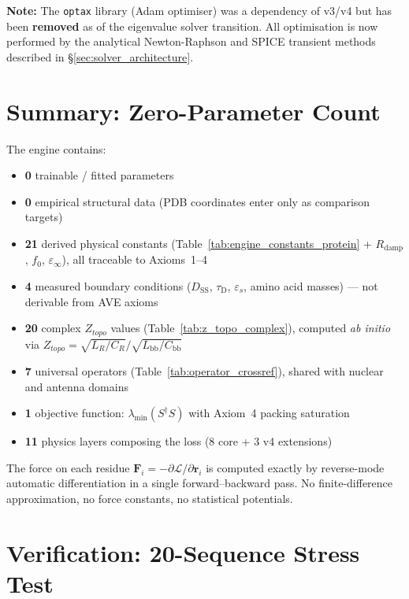 \noindent\textbf{Note:} The \texttt{optax} library (Adam optimiser) was a dependency of v3/v4 but has been \textbf{removed} as of the eigenvalue solver transition.  All optimisation is now performed by the analytical Newton-Raphson and SPICE transient methods described in \S\ref{sec:solver_architecture}.

\section{Summary: Zero-Parameter Count}

The engine contains:
\begin{itemize}
    \item \textbf{0} trainable / fitted parameters
    \item \textbf{0} empirical structural data (PDB coordinates enter only as comparison targets)
    \item \textbf{21} derived physical constants (Table~\ref{tab:engine_constants_protein} + $R_\text{damp}$, $f_0$, $\varepsilon_\infty$), all traceable to Axioms~1--4
    \item \textbf{4} measured boundary conditions ($D_\text{SS}$, $\tau_\text{D}$, $\varepsilon_s$, amino acid masses) --- not derivable from AVE axioms
    \item \textbf{20} complex $Z_{topo}$ values (Table~\ref{tab:z_topo_complex}), computed \emph{ab initio} via $Z_{topo} = \sqrt{L_R/C_R}/\sqrt{L_\text{bb}/C_\text{bb}}$
    \item \textbf{7} universal operators (Table~\ref{tab:operator_crossref}), shared with nuclear and antenna domains
    \item \textbf{1} objective function: $\lambda_{\min}(S^\dagger S)$ with Axiom~4 packing saturation
    \item \textbf{11} physics layers composing the loss (8 core + 3 v4 extensions)
\end{itemize}

The force on each residue $\mathbf{F}_i = -\partial \mathcal{L} / \partial \mathbf{r}_i$ is computed exactly by reverse-mode automatic differentiation in a single forward--backward pass.  No finite-difference approximation, no force constants, no statistical potentials.

\section{Verification: 20-Sequence Stress Test}
\label{sec:stress_test_v3}

